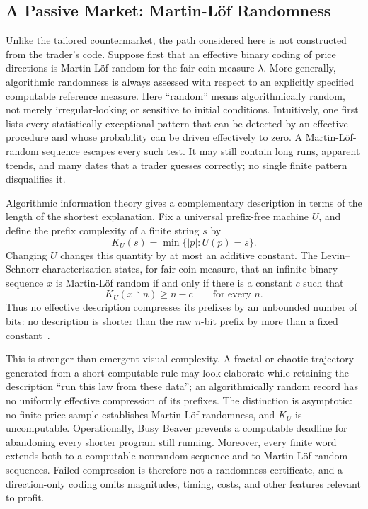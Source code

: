 \documentclass[aps,pra,reprint,superscriptaddress,amsmath,amssymb,floatfix]{revtex4-2}
\theoremstyle{plain}
\theoremstyle{definition}
\theoremstyle{remark}
\begin{document}
\subsection{A Passive Market: Martin-L\"of Randomness}

Unlike the tailored countermarket, the path considered here is not constructed
from the trader's code. Suppose first that an effective binary coding of price
directions is Martin-L\"of random for the fair-coin measure \(\lambda\). More
generally, algorithmic randomness is always assessed with respect to an
explicitly specified computable reference measure. Here ``random'' means
algorithmically random, not merely irregular-looking or sensitive to initial
conditions. Intuitively, one first lists every
statistically exceptional pattern that can be detected by an effective
procedure and whose probability can be driven effectively to zero. A
Martin-L\"of-random sequence escapes every such test. It may still contain long
runs, apparent trends, and many dates that a trader guesses correctly; no
single finite pattern disqualifies it.

Algorithmic information theory gives a complementary description in terms of
the length of the shortest explanation. Fix a universal prefix-free machine
\(U\), and define the prefix complexity of a finite string \(s\) by
\begin{equation}
  K_U(s)=\min\{|p|:U(p)=s\}.
  \label{eq:prefixcomplexity}
\end{equation}
Changing \(U\) changes this quantity by at most an additive constant. The
Levin--Schnorr characterization states, for fair-coin measure, that an infinite
binary sequence \(x\) is Martin-L\"of random if and only if there is a constant
\(c\) such that
\begin{equation}
  K_U(x{\upharpoonright}n)\geq n-c
  \qquad\text{for every }n.
  \label{eq:levinschnorr}
\end{equation}
Thus no effective description compresses its prefixes by an unbounded number
of bits: no description is shorter than the raw \(n\)-bit prefix by more than
a fixed constant~\cite{Chaitin-1974,calude:02,Nies2009}.

This is stronger than emergent visual complexity. A fractal or chaotic
trajectory generated from a short computable rule may look elaborate while
retaining the description ``run this law from these data''; an algorithmically
random record has no uniformly effective compression of its prefixes. The
distinction is asymptotic: no finite price sample establishes Martin-L\"of
randomness, and \(K_U\) is uncomputable. Operationally, Busy Beaver prevents a
computable deadline for abandoning every shorter program still running.
Moreover, every finite word extends both to a computable nonrandom sequence and
to Martin-L\"of-random sequences. Failed compression is therefore not a
randomness certificate, and a direction-only coding omits magnitudes, timing,
costs, and other features relevant to profit.
\end{document}
